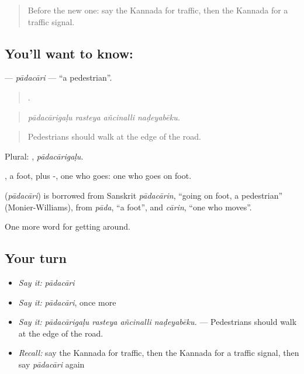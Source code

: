 \label{lesson:KA-C443-padacari}



\begin{quote}
Before the new one: say the Kannada for traffic, then the Kannada for a traffic signal.
\end{quote}

\subsection*{You'll want to know: }
\textbf{} — \emph{pādacāri} — \textquotedblleft{}a pedestrian\textquotedblright{}.

\begin{quote}
   .
\end{quote}

\begin{quote}
\emph{pādacārigaḷu rasteya añcinalli naḍeyabēku.}
\end{quote}

\begin{quote}
Pedestrians should walk at the edge of the road.
\end{quote}

Plural: , \emph{pādacārigaḷu}.

, a foot, plus -, one who goes: one who goes on foot.

\begin{cousinweb}
\textbf{} (\emph{pādacāri}) is borrowed from Sanskrit \emph{pādacārin}, \textquotedblleft{}going on foot, a pedestrian\textquotedblright{} (Monier-Williams), from \emph{pāda}, \textquotedblleft{}a foot\textquotedblright{}, and \emph{cārin}, \textquotedblleft{}one who moves\textquotedblright{}.
\end{cousinweb}

\begin{grammarlens}[title={What you've built}]
One more word for getting around.
\end{grammarlens}

\subsection*{Your turn}
\begin{itemize}
\raggedright
  \item \emph{Say it:} \emph{pādacāri}
  \item \emph{Say it:} \emph{pādacāri}, once more
  \item \emph{Say it:} \emph{pādacārigaḷu rasteya añcinalli naḍeyabēku.} — Pedestrians should walk at the edge of the road.
  \item \emph{Recall:} say the Kannada for traffic, then the Kannada for a traffic signal, then say \emph{pādacāri} again
\end{itemize}

